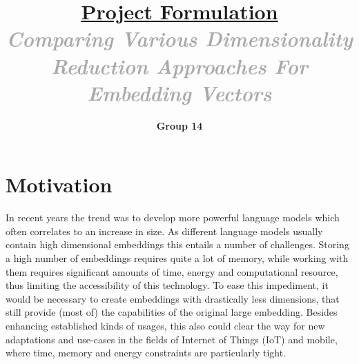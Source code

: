\documentclass{article}
\title{\vspace{-3.0cm}\underline{Project Formulation} \\ \vspace{0.3cm} \LARGE\textit{\textcolor{darkgray}{Comparing Various Dimensionality Reduction Approaches For Embedding Vectors}}}
\author{\textbf{Group 14}}
\begin{document}
\maketitle
\fontsize{10.5}{10.5} \selectfont

\section{Motivation}
In recent years the trend was to develop more powerful language models which often correlates to an increase in size. As different language models usually contain high dimensional embeddings this entails a number of challenges. Storing a high number of embeddings requires quite a lot of memory, while working with them requires significant amounts of time, energy and computational resource, thus limiting the accessibility of this technology.
To ease this impediment, it would be necessary to create embeddings with drastically less dimensions, that still provide (most of)  the capabilities of the original large embedding.
Besides enhancing established kinds of usages, this also could clear the way for new adaptations and use-cases in the fields of Internet of Things (IoT) and mobile, where time, memory and energy constraints are particularly tight. 
\end{document}
